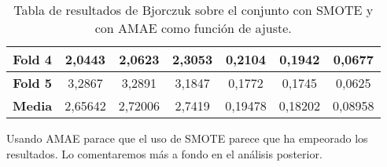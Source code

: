 \begin{table}[H]
{\begin{tabular}{|ccccccc|}
\multicolumn{1}{|c|}{\textbf{Fold 4}}            & \multicolumn{1}{c|}{2,0443}            & \multicolumn{1}{c|}{2,0623}              & \multicolumn{1}{c|}{\textbf{2,3053}} & \multicolumn{1}{c|}{0,2104}            & \multicolumn{1}{c|}{0,1942}              & 0,0677          \\ \hline
\multicolumn{1}{|c|}{\textbf{Fold 5}}            & \multicolumn{1}{c|}{3,2867}            & \multicolumn{1}{c|}{3,2891}              & \multicolumn{1}{c|}{3,1847}          & \multicolumn{1}{c|}{0,1772}            & \multicolumn{1}{c|}{0,1745}              & 0,0625          \\ \hline
\multicolumn{1}{|c|}{\textbf{Media}}             & \multicolumn{1}{c|}{2,65642}           & \multicolumn{1}{c|}{2,72006}             & \multicolumn{1}{c|}{2,7419}          & \multicolumn{1}{c|}{0,19478}           & \multicolumn{1}{c|}{0,18202}             & 0,08958         \\ \hline
\end{tabular}%
}
\caption{Tabla de resultados de Bjorczuk sobre el conjunto con SMOTE y con AMAE como función de ajuste.}\label{tablaBJORCZUKconSMOTEconAMAE}
\end{table}

Usando AMAE parace que el uso de SMOTE parece que ha empeorado los resultados. Lo comentaremos más a fondo en el análisis posterior.

